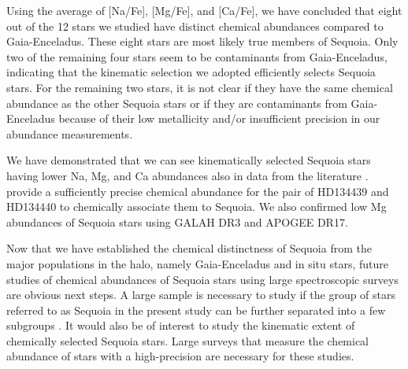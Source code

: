 \documentclass{aa}
\begin{document}
Using the average of [{Na}/{Fe}], [{Mg}/{Fe}], and [{Ca}/{Fe}], we have concluded that eight out of the 12 stars we studied have distinct chemical abundances compared to Gaia-Enceladus.
These eight stars are most likely true members of Sequoia.
Only two of the remaining four stars seem to be contaminants from Gaia-Enceladus, indicating that the kinematic selection we adopted efficiently selects Sequoia stars.
For the remaining two stars, it is not clear if they have the same chemical abundance as the other Sequoia stars or if they are contaminants from Gaia-Enceladus because of their low metallicity and/or insufficient precision in our abundance measurements.

We have demonstrated that we can see kinematically selected Sequoia stars having lower Na, Mg, and Ca abundances also in data from the literature \citep{Stephens2002,Ishigaki2012,Reggiani2018a}.
\citet{Reggiani2018a} provide a sufficiently precise chemical abundance for the pair of HD134439 and HD134440 to chemically associate them to Sequoia.
We also confirmed low Mg abundances of Sequoia stars using GALAH DR3 and APOGEE DR17.

Now that we have established the chemical distinctness of Sequoia from the major populations in the halo, namely Gaia-Enceladus and in situ stars, future studies of chemical abundances of Sequoia stars using large spectroscopic surveys are obvious next steps. 
A large sample is necessary to study if the group of stars referred to as Sequoia in the present study can be further separated into a few subgroups \citep{Naidu2020a,Loevdal2022a,RuizLara2022a}. 
It would also be of interest to study the kinematic extent of chemically selected Sequoia stars. 
Large surveys that measure the chemical abundance of stars with a high-precision are necessary for these studies.  
\end{document}

